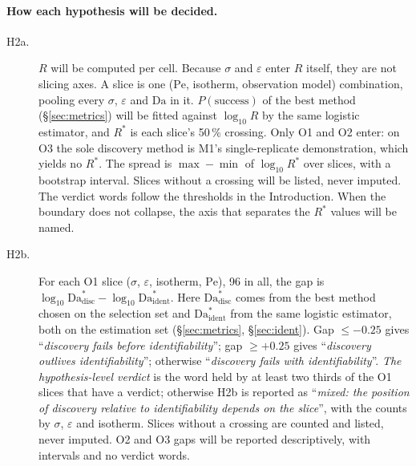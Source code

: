 \documentclass[11pt]{article}
\newcommand{\Da}{\mathrm{Da}}
\newcommand{\Pe}{\mathrm{Pe}}
\newcommand{\verdict}[1]{``\textit{#1}''}
\begin{document}
\paragraph{How each hypothesis will be decided.}
\begin{description}
\item[H2a.] $R$ will be computed per cell. Because $\sigma$ and $\varepsilon$ enter $R$
itself, they are not slicing axes. A slice is one ($\Pe$, isotherm, observation model)
combination, pooling every $\sigma$, $\varepsilon$ and $\Da$ in it. $P(\text{success})$
of the best method (\S\ref{sec:metrics}) will be fitted against $\log_{10} R$ by the same
logistic estimator, and $R^{*}$ is each slice's 50\,\% crossing. Only O1 and O2 enter: on
O3 the sole discovery method is M1's single-replicate demonstration, which yields no
$R^{*}$. The spread is $\max - \min$ of $\log_{10} R^{*}$ over slices, with a bootstrap
interval. Slices without a crossing will be listed, never imputed. The verdict words
follow the thresholds in the Introduction. When the boundary does not collapse, the axis
that separates the $R^{*}$ values will be named.
\item[H2b.] For each O1 slice ($\sigma$, $\varepsilon$, isotherm, $\Pe$), 96 in all, the gap is
$\log_{10}\Da^{*}_{\mathrm{disc}} - \log_{10}\Da^{*}_{\mathrm{ident}}$. Here
$\Da^{*}_{\mathrm{disc}}$ comes from the best method chosen on the selection set and
$\Da^{*}_{\mathrm{ident}}$ from the same logistic estimator, both on the estimation set
(\S\ref{sec:metrics}, \S\ref{sec:ident}). Gap $\le -0.25$ gives \verdict{discovery fails
before identifiability}; gap $\ge +0.25$ gives \verdict{discovery outlives
identifiability}; otherwise \verdict{discovery fails with identifiability}. \emph{The
hypothesis-level verdict} is the word held by at least two thirds of the O1 slices that
have a verdict; otherwise H2b is reported as \verdict{mixed: the position of discovery
relative to identifiability depends on the slice}, with the counts by $\sigma$,
$\varepsilon$ and isotherm. Slices without a crossing are counted and listed, never
imputed. O2 and O3 gaps will be reported descriptively, with intervals and no verdict
words.


\end{description}
\end{document}
